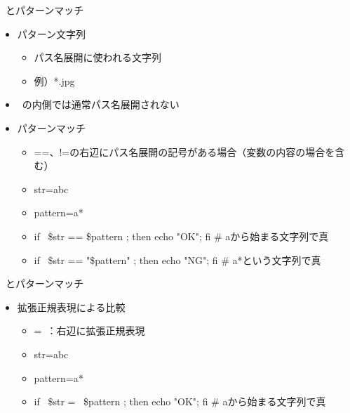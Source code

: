 \documentclass[12pt,aspectratio=169]{beamer}
\begin{document}
\begin{frame}{\lbrack\lbrack\ \rbrack\rbrack とパターンマッチ}

  \begin{itemize}
    \item パターン文字列
    \begin{itemize}
      \item パス名展開に使われる文字列
      \item 例）*.jpg
    \end{itemize}
    \item \lbrack\lbrack\ \rbrack\rbrack の内側では通常パス名展開されない
    \item パターンマッチ
    \begin{itemize}
      \item ==、!=の右辺にパス名展開の記号がある場合（変数の内容の場合を含む）
      \item str=abc
      \item pattern=a*
      \item if \lbrack\lbrack\ \$str == \$pattern \rbrack\rbrack ; then echo "OK"; fi \# aから始まる文字列で真
      \item if \lbrack\lbrack\ \$str == "\$pattern" \rbrack\rbrack ; then echo "NG"; fi \# a*という文字列で真
    \end{itemize}
  \end{itemize}

\end{frame}

\begin{frame}{\lbrack\lbrack\ \rbrack\rbrack とパターンマッチ}

  \begin{itemize}
    \item 拡張正規表現による比較
    \begin{itemize}
      \item =~：右辺に拡張正規表現
      \item str=abc
      \item pattern=a*
      \item if \lbrack\lbrack\ \$str =~ \$pattern \rbrack\rbrack ; then echo "OK"; fi \# aから始まる文字列で真
    \end{itemize}
  \end{itemize}

\end{frame}
\end{document}
